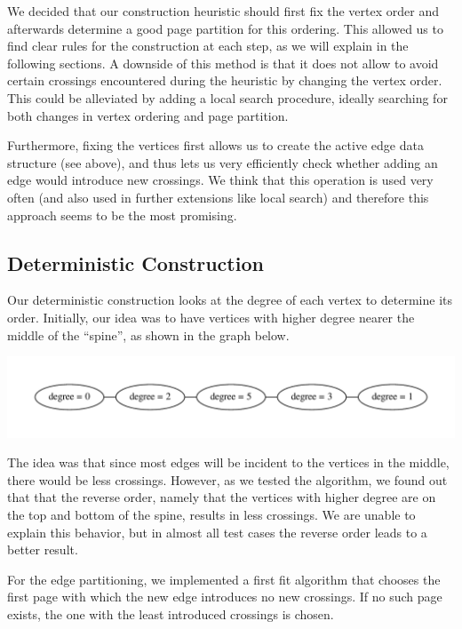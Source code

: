 \documentclass [11pt]{article}
\begin{document}
We decided that our construction heuristic should first fix the vertex order and afterwards determine a good page partition for this ordering. This allowed us to find clear rules for the construction at each step, as we will explain in the following sections. A downside of this method is that it does not allow to avoid certain crossings encountered during the heuristic by changing the vertex order. This could be alleviated by adding a local search procedure, ideally searching for both changes in vertex ordering and page partition. 

Furthermore, fixing the vertices first allows us to create the active edge data structure (see above), and thus lets us very efficiently check whether adding an edge would introduce new crossings. We think that this operation is used very often (and also used in further extensions like local search) and therefore this approach seems to be the most promising.


\subsection{Deterministic Construction}

Our deterministic construction looks at the degree of each vertex to determine its order. Initially, our idea was to have vertices with higher degree nearer the middle of the ``spine'', as shown in the graph below. 
\begin{center}
    \includegraphics[scale=0.6]{bilder/graph.pdf}
\end{center}
The idea was that since most edges will be incident to the vertices in the middle, there would be less crossings. However, as we tested the algorithm, we found out that that the reverse order, namely that the vertices with higher degree are on the top and bottom of the spine, results in less crossings. We are unable to explain this behavior, but in almost all test cases the reverse order leads to a better result. 


For the edge partitioning, we implemented a first fit algorithm that chooses the first page with which the new edge introduces no new crossings. If no such page exists, the one with the least introduced crossings is chosen. 
\end{document}
